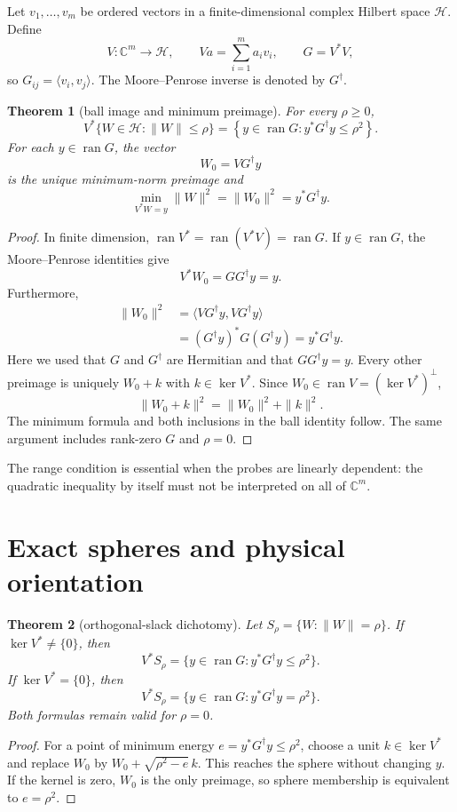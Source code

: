 \documentclass[11pt]{article}
\newtheorem{theorem}{Theorem}[section]
\theoremstyle{remark}
\newcommand{\cH}{\mathcal H}
\newcommand{\Ran}{\operatorname{ran}}
\newcommand{\Ker}{\operatorname{ker}}
\begin{document}
Let $v_1,\ldots,v_m$ be ordered vectors in a finite-dimensional complex Hilbert
space $\cH$.  Define
\[
 V:\mathbb C^m\longrightarrow\cH,\qquad Va=\sum_{i=1}^m a_iv_i,
 \qquad G=V^*V,
\]
so $G_{ij}=\langle v_i,v_j\rangle$.  The Moore--Penrose inverse is denoted by
$G^\dagger$.

\begin{theorem}[ball image and minimum preimage]\label{thm:ball}
For every $\rho\geq0$,
\[
 V^*\{W\in\cH:\|W\|\leq\rho\}
 =\left\{y\in\Ran G:y^*G^\dagger y\leq\rho^2\right\}.
\]
For each $y\in\Ran G$, the vector
\[
 W_0=VG^\dagger y
\]
is the unique minimum-norm preimage and
\[
 \min_{V^*W=y}\|W\|^2=\|W_0\|^2=y^*G^\dagger y.
\]
\end{theorem}

\begin{proof}
In finite dimension, $\Ran V^*=\Ran(V^*V)=\Ran G$.  If $y\in\Ran G$, the
Moore--Penrose identities give
\[
 V^*W_0=GG^\dagger y=y.
\]
Furthermore,
\begin{align*}
 \|W_0\|^2
 &=\langle VG^\dagger y,VG^\dagger y\rangle\\
 &=(G^\dagger y)^*G(G^\dagger y)
 =y^*G^\dagger y.
\end{align*}
Here we used that $G$ and $G^\dagger$ are Hermitian and that
$GG^\dagger y=y$.  Every other preimage is uniquely $W_0+k$ with
$k\in\Ker V^*$.  Since $W_0\in\Ran V=(\Ker V^*)^\perp$,
\[
 \|W_0+k\|^2=\|W_0\|^2+\|k\|^2.
\]
The minimum formula and both inclusions in the ball identity follow.  The same
argument includes rank-zero $G$ and $\rho=0$.
\end{proof}

The range condition is essential when the probes are linearly dependent: the
quadratic inequality by itself must not be interpreted on all of
$\mathbb C^m$.

\section{Exact spheres and physical orientation}

\begin{theorem}[orthogonal-slack dichotomy]\label{thm:sphere}
Let $S_\rho=\{W:\|W\|=\rho\}$.  If $\Ker V^*\neq\{0\}$, then
\[
 V^*S_\rho=\{y\in\Ran G:y^*G^\dagger y\leq\rho^2\}.
\]
If $\Ker V^*=\{0\}$, then
\[
 V^*S_\rho=\{y\in\Ran G:y^*G^\dagger y=\rho^2\}.
\]
Both formulas remain valid for $\rho=0$.
\end{theorem}

\begin{proof}
For a point of minimum energy $e=y^*G^\dagger y\leq\rho^2$, choose a unit
$k\in\Ker V^*$ and replace $W_0$ by
$W_0+\sqrt{\rho^2-e}\,k$.  This reaches the sphere without changing $y$.
If the kernel is zero, $W_0$ is the only preimage, so sphere membership is
equivalent to $e=\rho^2$.
\end{proof}
\end{document}

